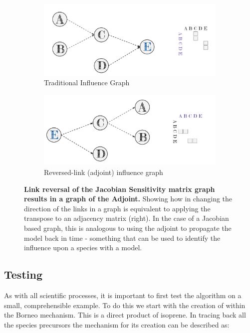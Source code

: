 \begin{figure}[H]
    \centering
\begin{subfigure}{.9\textwidth}
  \centering
  \includegraphics[width=\textwidth]{figures_c3/traditional.pdf}
  \caption{Traditional Influence Graph} 
\end{subfigure}

\begin{subfigure}{.9\textwidth }
  \centering
  \includegraphics[width=\textwidth]{figures_c3/adjoint.pdf}
  \caption{Reversed-link (adjoint) influence graph}
\end{subfigure}

\caption{\textbf{Link reversal of the Jacobian Sensitivity matrix graph results in a graph of the Adjoint.} Showing how in changing the direction of the links in a graph is equivalent to applying the transpose to an adjacency matrix (right). In the case of a Jacobian based graph, this is analogous to using the adjoint to propagate the model back in time - something that can be used to identify the influence upon a species with a model.}
  \label{fig:prgraphs}
\end{figure}




\subsection{Testing}
As with all scientific processes, it is important to first test the algorithm on a small, comprehensible example. To do this we start with the creation of  within the Borneo mechanism. This is a direct product of isoprene. In tracing back all the species precursors the mechanism for its creation can be described as: 

